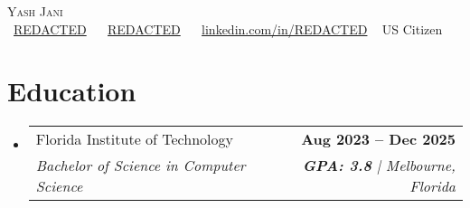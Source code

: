 \documentclass[letterpaper,11pt]{article}
\makeatletter
\newcommand{\resumeSubheading}[4]{
  \vspace{-2pt}\item
    \begin{tabular*}{1.0\textwidth}[t]{l@{\extracolsep{\fill}}r}
      \small#1 & \textbf{\small #2} \\
      \textit{\small#3} & \textit{\small #4} \\
    \end{tabular*}\vspace{-9pt}
}
\newcommand{\resumeSubHeadingListStart}{\begin{itemize}[leftmargin=0.0in, label={}]}
\newcommand{\resumeSubHeadingListEnd}{\end{itemize}}
\makeatother
\begin{document}
\begin{center}
    {\Huge \scshape Yash Jani} \\ \vspace{1pt}
    \small
    \raisebox{-0.2\height}{\faEnvelope}~\href{mailto:REDACTED}{REDACTED} ~
    \raisebox{-0.1\height}{\faPhone}~\href{tel:REDACTED}{REDACTED} ~
    \raisebox{-0.2\height}{\faLinkedin}~\href{https://www.linkedin.com/in/REDACTED}{linkedin.com/in/REDACTED} ~
    US Citizen
    \vspace{-10pt}
\end{center}


\section{Education}
  \resumeSubHeadingListStart
    \resumeSubheading      
      {Florida Institute of Technology}{Aug 2023 -- Dec 2025}
      {Bachelor of Science in Computer Science}{\textbf{GPA: 3.8} | Melbourne, Florida}
  \resumeSubHeadingListEnd
  \vspace{-5pt}
  
\end{document}
